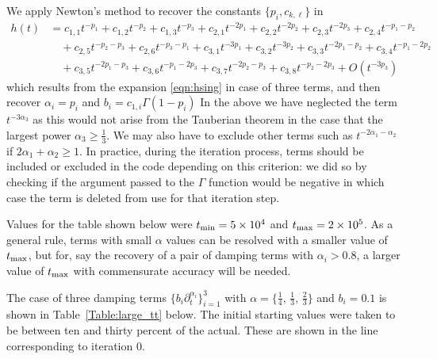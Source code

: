 We apply Newton's method to recover the constants $\{p_i,c_{k,\ell}\}$ in 
\[
\begin{aligned}
h(t) &= 
c_{1,1} t^{-p_1}
+c_{1,2} t^{-p_2}
+c_{1,3} t^{-p_3}
+c_{2,1} t^{-2p_1}
+c_{2,2} t^{-2p_2}
+c_{2,3} t^{-2p_3}
+c_{2,4} t^{-p_1-p_2}
\\&\quad+c_{2,5} t^{-p_2-p_3}
+c_{2,6} t^{-p_3-p_1}
+c_{3,1} t^{-3p_1}
+c_{3,2} t^{-3p_2}
+c_{3,3} t^{-2p_1-p_2}
+c_{3,4} t^{-p_1-2p_2}
\\&\quad+c_{3,5} t^{-2p_1-p_3}
+c_{3,6} t^{-p_1-2p_3}
+c_{3,7} t^{-2p_2-p_3}
+c_{3,8} t^{-p_2-2p_3}
+O(t^{-3p_3})
\end{aligned}
\]
which results from the expansion \eqref{eqn:hsing} in case of three terms,
and then recover $\alpha_i=p_i$ and $b_i=c_{1,i}\Gamma(1-p_i)$  
In the above we have neglected the term $t^{-3\alpha_3}$ as this would not arise
from the Tauberian theorem in the case that the largest power
$\alpha_3 \geq \frac{1}{3}$.
We may also have to exclude other terms such as  
$t^{-2\alpha_1-\alpha_2}$
if
$2\alpha_1 + \alpha_2 \geq 1$.
In practice, during the iteration process, terms should be included or excluded
in the code depending on this criterion: we did so by checking
if the argument passed to the $\Gamma$ function would be negative in which
case the term is deleted from use for that iteration step.

Values for the table shown below were
$t_{\rm min}=5\times 10^4$ and $t_{\rm max}=2\times 10^5$.
As a general rule, terms with small $\alpha$ values can be resolved
with a smaller value of $t_{\rm max}$, but for, say the recovery of
a pair of damping terms with $\alpha_i>0.8$, a larger value 
of $t_{\rm max}$ with commensurate accuracy will be needed.

The case of three damping terms 
$\{b_i\partial^{\alpha_i}_t\}_{i=1}^3$ 
with
$\alpha = \{\frac{1}{4},\,\frac{1}{3},\,\frac{2}{3}\}$ and $b_i=0.1$
is shown in Table~\ref{Table:large_tt} below.
The initial starting values were taken to be between ten and thirty percent
of the actual.
These are shown in the line corresponding to iteration $0$.

